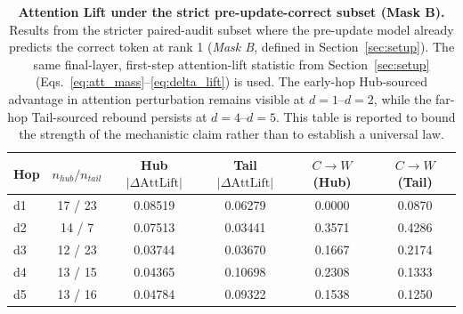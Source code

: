 \begin{table}[htbp]
\centering
\small
\begin{tabular}{lccccc}
\toprule
\textbf{Hop} & \textbf{$n_{hub}/n_{tail}$} & \textbf{Hub $|\Delta \mathrm{AttLift}|$} & \textbf{Tail $|\Delta \mathrm{AttLift}|$} & \textbf{$C \rightarrow W$ (Hub)} & \textbf{$C \rightarrow W$ (Tail)} \\
\midrule
d1 & 17 / 23 & 0.08519 & 0.06279 & 0.0000 & 0.0870 \\
d2 & 14 / 7  & 0.07513 & 0.03441 & 0.3571 & 0.4286 \\
d3 & 12 / 23 & 0.03744 & 0.03670 & 0.1667 & 0.2174 \\
d4 & 13 / 15 & 0.04365 & 0.10698 & 0.2308 & 0.1333 \\
d5 & 13 / 16 & 0.04784 & 0.09322 & 0.1538 & 0.1250 \\
\bottomrule
\end{tabular}
\caption{\label{tab:attention_lift_masked} \textbf{Attention Lift under the strict pre-update-correct subset (Mask B).} Results from the stricter paired-audit subset where the pre-update model already predicts the correct token at rank 1 (\emph{Mask B}, defined in Section~\ref{sec:setup}). The same final-layer, first-step attention-lift statistic from Section~\ref{sec:setup} (Eqs.~\ref{eq:att_mass}--\ref{eq:delta_lift}) is used. The early-hop Hub-sourced advantage in attention perturbation remains visible at $d{=}1$--$d{=}2$, while the far-hop Tail-sourced rebound persists at $d{=}4$--$d{=}5$. This table is reported to bound the strength of the mechanistic claim rather than to establish a universal law.}
\end{table}
